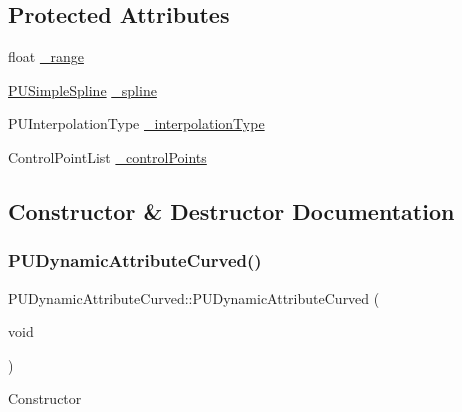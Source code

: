 \subsection*{Protected Attributes}
\begin{DoxyCompactItemize}
\item 
float \hyperlink{classPUDynamicAttributeCurved_ae873ec6bb110fab9dc6734a770d150b4}{\+\_\+range}
\item 
\hyperlink{classPUSimpleSpline}{P\+U\+Simple\+Spline} \hyperlink{classPUDynamicAttributeCurved_ad538d0847f67044fae46a4d0e31ba317}{\+\_\+spline}
\item 
P\+U\+Interpolation\+Type \hyperlink{classPUDynamicAttributeCurved_a64671cde3942ea2b19b0b6b62959f71a}{\+\_\+interpolation\+Type}
\item 
Control\+Point\+List \hyperlink{classPUDynamicAttributeCurved_afdab21108269dfd76d22f40841c0077d}{\+\_\+control\+Points}
\end{DoxyCompactItemize}


\subsection{Constructor \& Destructor Documentation}
\mbox{\label{classPUDynamicAttributeCurved_a12fc9225a908cbe9e4b0d6d18cadd7fe}} 
\subsubsection{\texorpdfstring{P\+U\+Dynamic\+Attribute\+Curved()}{PUDynamicAttributeCurved()}\hspace{0.1cm}{\footnotesize\ttfamily [1/4]}}
{\footnotesize\ttfamily P\+U\+Dynamic\+Attribute\+Curved\+::\+P\+U\+Dynamic\+Attribute\+Curved (\begin{DoxyParamCaption}\item[{void}]{ }\end{DoxyParamCaption})}

Constructor \mbox{\label{classPUDynamicAttributeCurved_a784415ec7fc8db1060cd7081fb3ff330}} 
